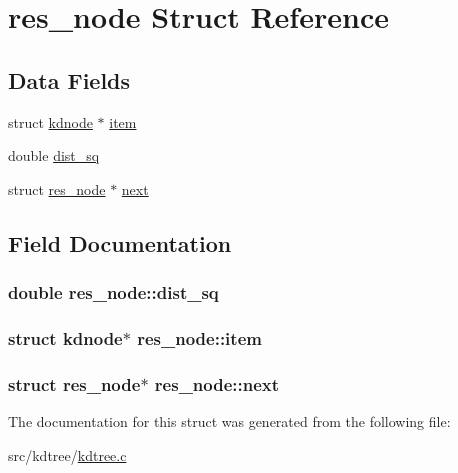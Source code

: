 \hypertarget{structres__node}{\section{res\+\_\+node Struct Reference}
\label{structres__node}
}
\subsection*{Data Fields}
\begin{DoxyCompactItemize}
\item 
struct \hyperlink{structkdnode}{kdnode} $\ast$ \hyperlink{structres__node_a6d1e853ec1f48f263c277344f37f8cc3}{item}
\item 
double \hyperlink{structres__node_ac291090c8cb9b8ec553c1eeee9c64882}{dist\+\_\+sq}
\item 
struct \hyperlink{structres__node}{res\+\_\+node} $\ast$ \hyperlink{structres__node_a218ec7f9710d71366f6ee1bcd647897b}{next}
\end{DoxyCompactItemize}


\subsection{Field Documentation}
\hypertarget{structres__node_ac291090c8cb9b8ec553c1eeee9c64882}{
\subsubsection[{dist\+\_\+sq}]{\setlength{\rightskip}{0pt plus 5cm}double res\+\_\+node\+::dist\+\_\+sq}}\label{structres__node_ac291090c8cb9b8ec553c1eeee9c64882}
\hypertarget{structres__node_a6d1e853ec1f48f263c277344f37f8cc3}{
\subsubsection[{item}]{\setlength{\rightskip}{0pt plus 5cm}struct {\bf kdnode}$\ast$ res\+\_\+node\+::item}}\label{structres__node_a6d1e853ec1f48f263c277344f37f8cc3}
\hypertarget{structres__node_a218ec7f9710d71366f6ee1bcd647897b}{
\subsubsection[{next}]{\setlength{\rightskip}{0pt plus 5cm}struct {\bf res\+\_\+node}$\ast$ res\+\_\+node\+::next}}\label{structres__node_a218ec7f9710d71366f6ee1bcd647897b}


The documentation for this struct was generated from the following file\+:\begin{DoxyCompactItemize}
\item 
src/kdtree/\hyperlink{kdtree_8c}{kdtree.\+c}\end{DoxyCompactItemize}
